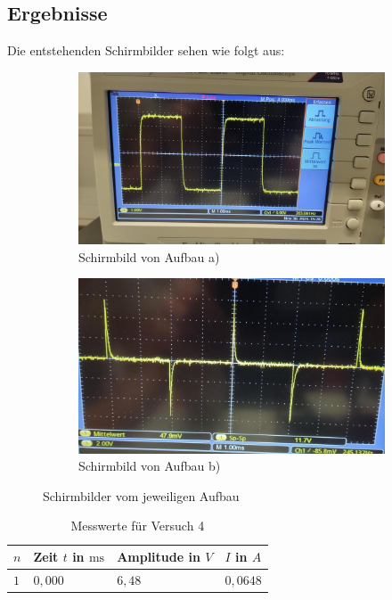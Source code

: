     \subsection{Ergebnisse}
        Die entstehenden Schirmbilder sehen wie folgt aus:
        
        \begin{figure}[H]
        	\begin{subfigure}{0.48\linewidth}
        		\includegraphics[width=\linewidth]{bilder/teila.png}
        		\caption{Schirmbild von Aufbau a)}
        		\label{fig:biold4}
        	\end{subfigure}
        	\hfill
        	\begin{subfigure}{0.48\linewidth}
        		\includegraphics[width=\linewidth]{bilder/teilb.png}
        		\caption{Schirmbild von Aufbau b)}
        		\label{fig:bild3}
        	\end{subfigure}
        	\caption{Schirmbilder vom jeweiligen Aufbau}
        	\label{fig:zwei-bilder-schirme}
        \end{figure}
        
        \begin{table}[h!]
            \centering
            \begin{tabular}{|l|l|l|l|}
                \hline
                $n$ & Zeit $t$ in $\mathrm{ms}$ & Amplitude in $V$ & $I$ in $A$\\
                \hline\hline
                $1$ & $0,000$ & $6,48$ & $0,0648$\\
                \hline
            \end{tabular}
            \caption{Messwerte für Versuch 4}
            \label{tab:versuch4}
        \end{table}

